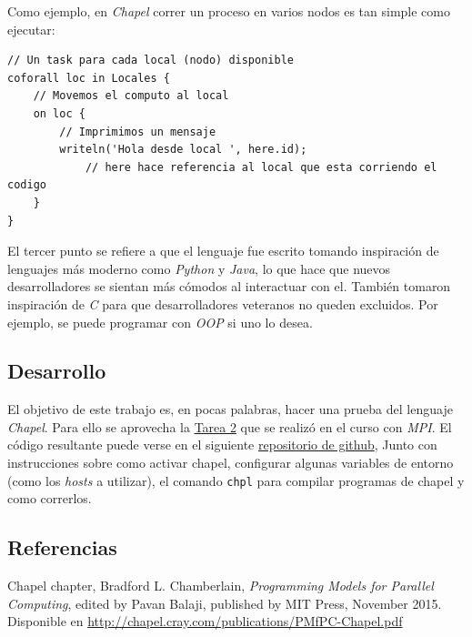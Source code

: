 \documentclass[10pt]{extarticle}
\begin{document}
Como ejemplo, en \textit{Chapel} correr un proceso en varios nodos es tan simple como ejecutar:

\begin{lstlisting}[language=Chapel]
// Un task para cada local (nodo) disponible
coforall loc in Locales {
	// Movemos el computo al local
	on loc {
		// Imprimimos un mensaje
		writeln('Hola desde local ', here.id);
			// here hace referencia al local que esta corriendo el codigo
	}
}
\end{lstlisting}

El tercer punto se refiere a que el lenguaje fue escrito tomando inspiración de lenguajes más moderno como \textit{Python} y \textit{Java}, lo que hace que nuevos desarrolladores se sientan más cómodos al interactuar con el. También tomaron inspiración de \textit{C} para que desarrolladores veteranos no queden excluidos. Por ejemplo, se puede programar con \textit{OOP} si uno lo desea.

\subsection*{Desarrollo}
El objetivo de este trabajo es, en pocas palabras, hacer una prueba del lenguaje \textit{Chapel}. Para ello se aprovecha la \href{https://github.com/negebauer/IIC3524-T2}{\color{blue!60}Tarea 2} que se realizó en el curso con \textit{MPI}. El código resultante puede verse en el siguiente \href{https://github.com/negebauer/IIC3524-Investigacion}{\color{blue!60}repositorio de github}, Junto con instrucciones sobre como activar chapel, configurar algunas variables de entorno (como los \textit{hosts} a utilizar), el comando \verb|chpl| para compilar programas de chapel y como correrlos.

\subsection*{Referencias}
Chapel chapter, Bradford L. Chamberlain, \textit{Programming Models for Parallel Computing}, edited by Pavan Balaji, published by MIT Press, November 2015. Disponible en \href{http://chapel.cray.com/publications/PMfPC-Chapel.pdf}{\color{blue!60}http://chapel.cray.com/publications/PMfPC-Chapel.pdf}

%
\end{document}
